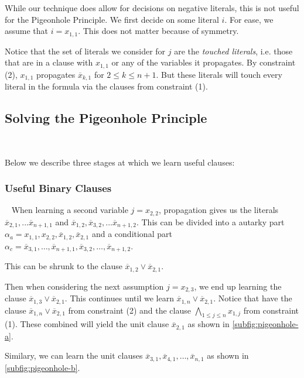 While our technique does allow for decisions on negative literals, this is not useful for the Pigeonhole Principle. We first decide on some literal $i$. For ease, we assume that $i = x_{1, 1}$. This does not matter because of symmetry.

Notice that the set of literals we consider for $j$ are the \emph{touched literals}, i.e. those that are in a clause with $x_{1, 1}$ or any of the variables it propagates. By constraint (2), $x_{1, 1}$ propagates $\overline{x}_{k, 1}$ for $2 \leq k \leq n + 1$. But these literals will touch every literal in the formula via the clauses from constraint (1). 


\subsection{Solving the Pigeonhole Principle}~\label{subsec:solvingpigeonhole}

Below we describe three stages at which we learn useful clauses:


\subsubsection{Useful Binary Clauses}~\label{subec:usefulbinaryclauses} When learning a second variable $j= x_{2, 2}$, propagation gives us the literals $\overline{x}_{2, 1}, ... \overline{x}_{n+1, 1}$ and $\overline{x}_{1, 2}, \overline{x}_{3, 2}, ... \overline{x}_{n+1, 2}$. This can be divided into a autarky part $\alpha_a = x_{1, 1}, x_{2, 2}, \overline{x}_{1, 2}, \overline{x}_{2, 1}$ and a conditional part $\alpha_c = \overline{x}_{3, 1}, \ldots, \overline{x}_{n+1, 1}, \overline{x}_{3, 2}, \ldots, \overline{x}_{n+1, 2}$.

This can be shrunk to the clause $\overline{x}_{1, 2} \lor \overline{x}_{2, 1}$.

Then when considering the next assumption $j = x_{2, 3}$, we end up learning the clause $\overline{x}_{1, 3} \lor \overline{x}_{2, 1}$. This continues until we learn $\overline{x}_{1, n} \lor \overline{x}_{2, 1}$. Notice that have the clause $\overline{x}_{1, n} \lor \overline{x}_{2, 1}$ from constraint (2) and the clause $\bigwedge_{1 \leq j \leq n} x_{1, j}$ from constraint (1). These combined will yield the unit clause $\overline{x}_{2, 1}$ as shown in \autoref{subfig:pigeonhole-a}.

Similary, we can learn the unit clauses $\overline{x}_{3, 1}, \overline{x}_{4, 1}, \ldots, \overline{x}_{n, 1}$ as shown in \autoref{subfig:pigeonhole-b}.


